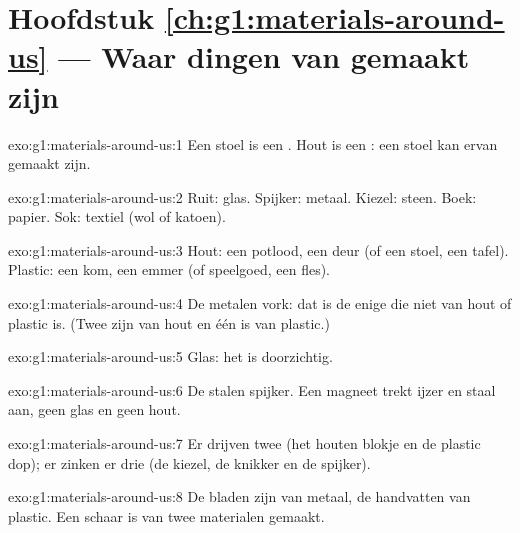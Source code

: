 \section*{Hoofdstuk \ref{ch:g1:materials-around-us} --- Waar dingen van gemaakt zijn}

\begin{solution}{exo:g1:materials-around-us:1}
Een stoel is een . Hout is een : een stoel kan ervan
gemaakt zijn.
\end{solution}

\begin{solution}{exo:g1:materials-around-us:2}
Ruit: glas. Spijker: metaal. Kiezel: steen. Boek: papier. Sok: textiel
(wol of katoen).
\end{solution}

\begin{solution}{exo:g1:materials-around-us:3}
Hout: een potlood, een deur (of een stoel, een tafel). Plastic: een kom,
een emmer (of speelgoed, een fles).
\end{solution}

\begin{solution}{exo:g1:materials-around-us:4}
De metalen vork: dat is de enige die niet van hout of plastic is. (Twee
zijn van hout en één is van plastic.)
\end{solution}

\begin{solution}{exo:g1:materials-around-us:5}
Glas: het is doorzichtig.
\end{solution}

\begin{solution}{exo:g1:materials-around-us:6}
De stalen spijker. Een magneet trekt ijzer en staal aan, geen glas en
geen hout.
\end{solution}

\begin{solution}{exo:g1:materials-around-us:7}
Er drijven twee  (het houten blokje en de plastic dop); er
zinken er drie (de kiezel, de knikker en de spijker).
\end{solution}

\begin{solution}{exo:g1:materials-around-us:8}
De bladen zijn van metaal, de handvatten van plastic. Een schaar is van
twee materialen gemaakt.
\end{solution}

